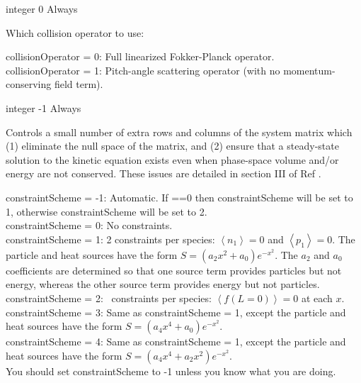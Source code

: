 \myhrule

{integer}
{0}
{Always}
{Which collision operator to use:\\

{\setlength{\parindent}{0cm}

{\ttfamily collisionOperator} = 0: Full linearized Fokker-Planck operator.\\

{\ttfamily collisionOperator} = 1: Pitch-angle scattering operator (with no momentum-conserving field term).
}}

\myhrule

{integer}
{-1}
{Always}
{Controls a small number of extra rows and columns of the system matrix
which (1) eliminate the null space of the matrix, and (2) ensure that a steady-state solution
to the kinetic equation exists even when phase-space volume and/or energy are not conserved.
These issues are detailed in section III of Ref \cite{sfincsPaper}.
\\

{\setlength{\parindent}{0cm}

{\ttfamily constraintScheme} = -1: Automatic. If ==0 then {\ttfamily constraintScheme} will be set to 1, 
otherwise {\ttfamily constraintScheme} will be set to 2.\\

{\ttfamily constraintScheme} = 0: No constraints.\\

{\ttfamily constraintScheme} = 1: 2 constraints per species: $\left<n_1\right>=0$ and $\left<p_1\right>=0$.
The particle and heat sources have the form $S = (a_2 x^2 + a_0) e^{-x^2}$.
The $a_2$ and $a_0$ coefficients are determined so that one source term provides particles but not energy,
whereas the other source term provides energy but not particles. \\

{\ttfamily constraintScheme} = 2: \Nx~constraints per species: $\left< f(L=0)\right>=0$ at each $x$.\\

{\ttfamily constraintScheme} = 3: Same as {\ttfamily constraintScheme} = 1,
except the particle and heat sources have the form $S = (a_4 x^4 + a_0) e^{-x^2}$.\\

{\ttfamily constraintScheme} = 4: Same as {\ttfamily constraintScheme} = 1,
except the particle and heat sources have the form $S = (a_4 x^4 + a_2 x^2) e^{-x^2}$.\\

You should set {\ttfamily constraintScheme} to -1 unless you know what you are doing.
}}

